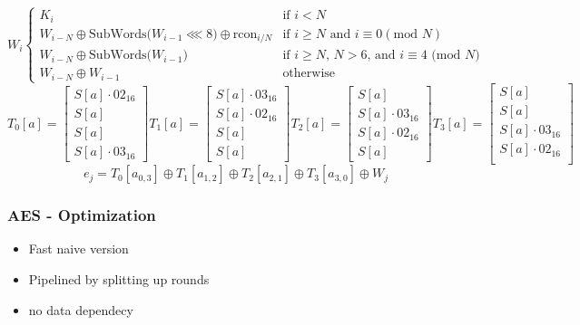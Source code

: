 \begin{frame}
  \begin{minipage}[b]{\linewidth}
    \fontsize{8pt}{6}
    \selectfont
    \begin{equation*}
      W_i
      \begin{cases}
        K_i & \text{if } i < N\\
        W_{i-N} \oplus \text{SubWords($W_{i-1}\lll 8$)} \oplus \text{rcon}_{i/N} & \text{if } i \geq N \text{ and }  i \equiv 0 (\text{mod } N)\\
      W_{i-N} \oplus \text{SubWords($W_{i-1}$)} & \text{if $i \geq N$, $N > 6$, and $i \equiv 4$ (mod $N$)}\\
      W_{i-N} \oplus W_{i-1} & \text{otherwise}
      \end{cases}
    \end{equation*}
    \fontsize{8pt}{6}
    \selectfont
    \begin{equation*}
      T_0[a] = \begin{bmatrix}
        S[a] \cdot 02_{16}\\
        S[a]\\
        S[a]\\
        S[a] \cdot 03_{16}
      \end{bmatrix}
      T_1[a] = \begin{bmatrix}
        S[a] \cdot 03_{16}\\
        S[a] \cdot 02_{16}\\
        S[a]\\
        S[a]
      \end{bmatrix}
      T_2[a] = \begin{bmatrix}
        S[a]\\
        S[a] \cdot 03_{16}\\
        S[a] \cdot 02_{16}\\
        S[a]
      \end{bmatrix}
      T_3[a] = \begin{bmatrix}
        S[a]\\
        S[a]\\
        S[a] \cdot 03_{16}\\
        S[a] \cdot 02_{16}\\
      \end{bmatrix}
    \end{equation*}
    \begin{equation*}
      e_j = T_0 [a_{0,3}] \oplus T_1 [a_{1,2}] \oplus T_2 [a_{2,1}] \oplus T_3 [a_{3,0}] \oplus W_j
    \end{equation*}

  \end{minipage}
\end{frame}

\begin{frame}
  \frametitle{AES - Optimization}
  \begin{itemize}
  \item Fast naive version
  \item Pipelined by splitting up rounds
  \item no data dependecy
  \end{itemize}
\end{frame}

